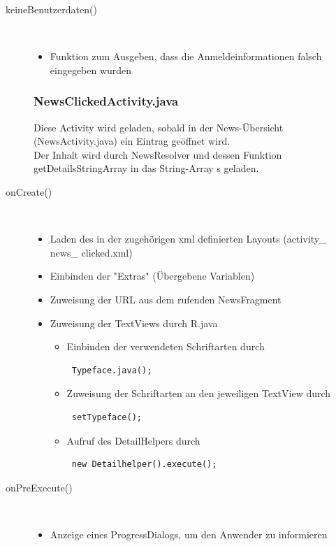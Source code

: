 \begin{description}
 
\item[keineBenutzerdaten()]~\par
\begin{itemize}
\item Funktion zum Ausgeben, dass die Anmeldeinformationen falsch eingegeben wurden
\end{itemize}

\subsubsection{NewsClickedActivity.java}
\lstset{language=JAVA}
Diese Activity wird geladen, sobald in der News-Übersicht (NewsActivity.java) ein Eintrag geöffnet wird. \\
Der Inhalt wird durch NewsResolver und dessen Funktion getDetailsStringArray in das String-Array s geladen.
\item[onCreate()]~\par
\begin{itemize}
\item Laden des in der zugehörigen xml definierten Layouts (activity\_ news\_ clicked.xml)
\item Einbinden der "Extras" (Übergebene Variablen)
\item Zuweisung der URL aus dem rufenden NewsFragment
\item Zuweisung der TextViews durch R.java
\begin{itemize}
\item Einbinden der verwendeten Schriftarten durch 
\begin{lstlisting}
 Typeface.java();
\end{lstlisting}
\item Zuweisung der Schriftarten an den jeweiligen TextView durch
\begin{lstlisting}
 setTypeface();
\end{lstlisting}
\item Aufruf des DetailHelpers durch 
\begin{lstlisting}
 new Detailhelper().execute();
\end{lstlisting}
\end{itemize}
\end{itemize}

\item[onPreExecute()]~\par
\begin{itemize}
\item Anzeige eines ProgressDialogs, um den Anwender zu informieren
\end{itemize}


\end{description}
